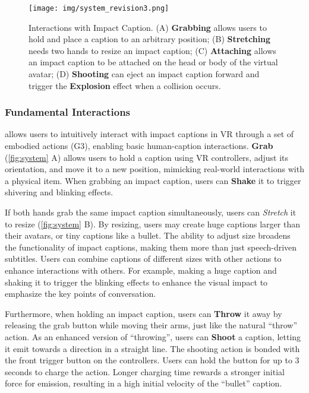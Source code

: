 \begin{figure*}[!ht]
    \centering
    \texttt{[image: img/system\_revision3.png]}
    \caption{
        Interactions with Impact Caption. 
        (A) \textbf{Grabbing} allows users to hold and place a caption to an arbitrary position;
        (B) \textbf{Stretching} needs two hands to resize an impact caption;
        (C) \textbf{Attaching} allows an impact caption to be attached on the head or body of the virtual avatar;
        (D) \textbf{Shooting} can eject an impact caption forward and trigger the \textbf{Explosion} effect when a collision occurs.
    }
    \label{fig:system}
\end{figure*}


\subsubsection{Fundamental Interactions}
\system{} allows users to intuitively interact with impact captions in VR through a set of embodied actions (G3), enabling basic human-caption interactions.
\textbf{Grab} (\autoref{fig:system} A) allows users to hold a caption using VR controllers, adjust its orientation, and move it to a new position, mimicking real-world interactions with a physical item.
When grabbing an impact caption, users can \textbf{Shake} it to trigger shivering and blinking effects.

If both hands grab the same impact caption simultaneously, users can \textit{Stretch} it to resize (\autoref{fig:system} B).
By resizing, users may create huge captions larger than their avatars, or tiny captions like a bullet. 
The ability to adjust size broadens the functionality of impact captions, making them more than just speech-driven subtitles. 
Users can combine captions of different sizes with other actions to enhance interactions with others. For example, making a huge caption and shaking it to trigger the blinking effects to enhance the visual impact to emphasize the key points of conversation.

Furthermore, when holding an impact caption, users can \textbf{Throw} it away by releasing the grab button while moving their arms, just like the natural ``throw'' action. 
As an enhanced version of ``throwing'', users can \textbf{Shoot} a caption, letting it emit towards a direction in a straight line. The shooting action is bonded with the front trigger button on the controllers. Users can hold the button for up to 3 seconds to charge the action. Longer charging time rewards a stronger initial force for emission, resulting in a high initial velocity of the ``bullet'' caption.

